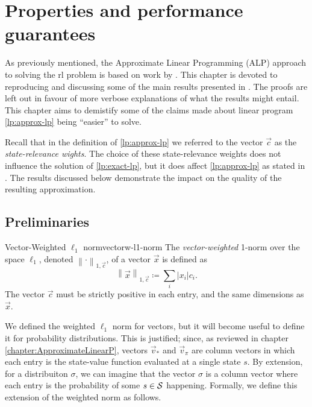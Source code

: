 \chapter{Properties and performance guarantees}
\label{chapter:PropertiesGuarantees}

As previously mentioned, the Approximate Linear Programming (ALP) approach to
solving the \ac{rl} problem is based on work by \citeauthor{farias2003LP2ADP}.
This chapter is devoted to reproducing and discussing some of the main results
presented in \cite{farias2003LP2ADP}. The proofs are left out in favour of more
verbose explanations of what the results might entail. This chapter aims to
demistify some of the claims made about linear program \eqref{lp:approx-lp}
being ``easier'' to solve.

Recall that in the definition of \eqref{lp:approx-lp} we referred to the vector
$\vec{c}$ as the \emph{state-relevance wights}. The choice of these
state-relevance weights does not influence the solution of \eqref{lp:exact-lp},
but it does affect \eqref{lp:approx-lp} as stated in \cite{farias2003LP2ADP}.
The results discussed below demonstrate the impact on the quality of the
resulting approximation.

\section{Preliminaries}

\begin{dfn}{Vector-Weighted $\ell_1$ norm}{vectorw-l1-norm}
    The \emph{vector-weighted} 1-norm over the space $\ell_1$, denoted $\left\|
    \cdot \right\|_{1, \vec{c}}$, of a vector $\vec{x}$ is defined as
    \[
        \left\| \vec{x} \right\|_{1, \vec{c}} \coloneqq  \sum_i |x_i| c_i.
    \]
    The vector $\vec{c}$ must be strictly positive in each entry, and the same
    dimensions as $\vec{x}$.
\end{dfn}

We defined the weighted $\ell_1$ norm for vectors, but it will become useful to
define it for probability distributions. This is justified; since, as reviewed
in chapter \ref{chapter:ApproximateLinearP}, vectors $\vec{v}_*$ and
$\vec{v}_\pi$ are column vectors in which each entry is the state-value function
evaluated at a single state $s$. By extension, for a distribuiton $\sigma$, we
can imagine that the vector $\sigma$ is a column vector where each entry is the
probability of some $s \in \mathcal{S}$ happening. Formally, we define this
extension of the weighted norm as follows.


